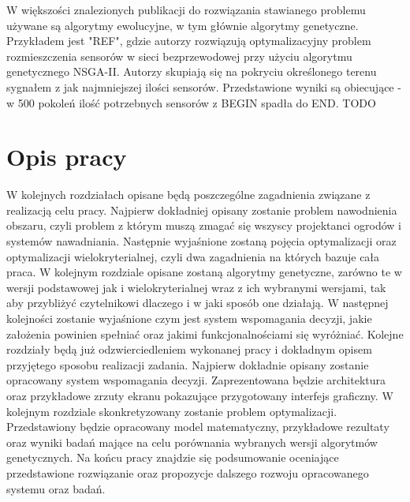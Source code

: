 \documentclass[twoside]{iisthesis}
\begin{document}
W większości znalezionych publikacji do rozwiązania stawianego problemu używane są algorytmy ewolucyjne, w tym głównie algorytmy genetyczne.
Przykładem jest "REF", gdzie autorzy rozwiązują optymalizacyjny problem rozmieszczenia sensorów w sieci bezprzewodowej przy użyciu algorytmu genetycznego NSGA-II. Autorzy skupiają się na pokryciu określonego terenu sygnałem z jak najmniejszej ilości sensorów. Przedstawione wyniki są obiecujące - w 500 pokoleń ilość potrzebnych sensorów z BEGIN spadła do END.
TODO

\section{Opis pracy}
W kolejnych rozdziałach opisane będą poszczególne zagadnienia związane z realizacją celu pracy. Najpierw dokładniej opisany zostanie problem nawodnienia obszaru, czyli problem z którym muszą zmagać się wszyscy projektanci ogrodów i systemów nawadniania. Następnie wyjaśnione zostaną pojęcia optymalizacji oraz optymalizacji wielokryterialnej, czyli dwa zagadnienia na których bazuje cała praca. W kolejnym rozdziale opisane zostaną algorytmy genetyczne, zarówno te w wersji podstawowej jak i wielokryterialnej wraz z ich wybranymi wersjami, tak aby przybliżyć czytelnikowi dlaczego i w jaki sposób one działają. W następnej kolejności zostanie wyjaśnione czym jest system wspomagania decyzji, jakie założenia powinien spełniać oraz jakimi funkcjonalnościami się wyróżniać. Kolejne rozdziały będą już odzwierciedleniem wykonanej pracy i dokładnym opisem przyjętego sposobu realizacji zadania. Najpierw dokładnie opisany zostanie opracowany system wspomagania decyzji. Zaprezentowana będzie architektura oraz przykładowe zrzuty ekranu pokazujące przygotowany interfejs graficzny. W kolejnym rozdziale skonkretyzowany zostanie problem optymalizacji. Przedstawiony będzie opracowany model matematyczny, przykładowe rezultaty oraz wyniki badań mające na celu porównania wybranych wersji algorytmów genetycznych. Na końcu pracy znajdzie się podsumowanie oceniające przedstawione rozwiązanie oraz propozycje dalszego rozwoju opracowanego systemu oraz badań.
\end{document}
